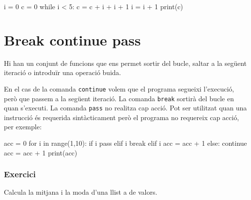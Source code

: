 \begin{tip}[caption=Càlcul de quadrats amb el bucle while]
i = 0
c = 0
while i < 5:
	c = c + i + i + 1
	i = i + 1
	print(c)
\end{tip}


\section{Break continue pass}

Hi han un conjunt de funcions que ens permet sortir del bucle, saltar a la següent iteració o introduïr una operació buida.

En el cas de la comanda {\tt continue} volem que el programa segueixi l'execució, però que passem a la següent iteració. La comanda {\tt break} sortirà del bucle en quan s'executi. La comanda {\tt pass} no realitza cap acció. Pot ser utilitzat quan una instrucció és requerida sintàcticament però el programa no requereix cap acció, per exemple:


\begin{tip}[caption=Break continue pass]
acc = 0
for i in range(1,10):
	if i %
		pass
	elif i %
		break
	elif i %
		acc = acc + 1
	else:
		continue
	acc = acc + 1
print(acc)
\end{tip}



\subsubsection*{Exercici } 


Calcula la mitjana i la moda d'una llist a de valors.



